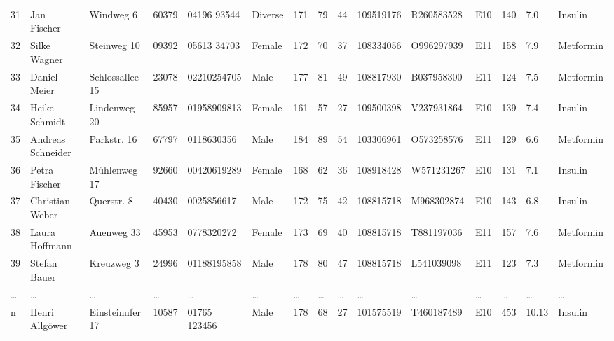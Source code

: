 \begin{table}
\begin{longtable}{lllllllllllllll}
    31 & Jan Fischer & Windweg 6 & 60379 & 04196 93544 & Diverse & 171 & 79 & 44 & 109519176 & R260583528 & E10 & 140 & 7.0 & Insulin \\
    32 & Silke Wagner & Steinweg 10 & 09392 & 05613 34703 & Female & 172 & 70 & 37 & 108334056 & O996297939 & E11 & 158 & 7.9 & Metformin \\
    33 & Daniel Meier & Schlossallee 15 & 23078 & 02210254705 & Male & 177 & 81 & 49 & 108817930 & B037958300 & E11 & 124 & 7.5 & Metformin \\
    34 & Heike Schmidt & Lindenweg 20 & 85957 & 01958909813 & Female & 161 & 57 & 27 & 109500398 & V237931864 & E10 & 139 & 7.4 & Insulin \\
    35 & Andreas Schneider & Parkstr. 16 & 67797 & 0118630356 & Male & 184 & 89 & 54 & 103306961 & O573258576 & E11 & 129 & 6.6 & Metformin \\
    36 & Petra Fischer & Mühlenweg 17 & 92660 & 00420619289 & Female & 168 & 62 & 36 & 108918428 & W571231267 & E10 & 131 & 7.1 & Insulin \\
    37 & Christian Weber & Querstr. 8 & 40430 & 0025856617 & Male & 172 & 75 & 42 & 108815718 & M968302874 & E10 & 143 & 6.8 & Insulin \\
    38 & Laura Hoffmann & Auenweg 33 & 45953 & 0778320272 & Female & 173 & 69 & 40 & 108815718 & T881197036 & E11 & 157 & 7.6 & Metformin \\
    39 & Stefan Bauer & Kreuzweg 3 & 24996 & 01188195858 & Male & 178 & 80 & 47 & 108815718 & L541039098 & E11 & 123 & 7.3 & Metformin \\
    \dots & \dots & \dots & \dots & \dots & \dots & \dots & \dots & \dots & \dots & \dots & \dots & \dots & \dots & \dots \\
    n & Henri Allgöwer & Einsteinufer 17 & 10587 & 01765 123456 & Male & 178 & 68 & 27 & 101575519 & T460187489 & E10 & 453 & 10.13 & Insulin \\

    \end{longtable}    
\end{table}

